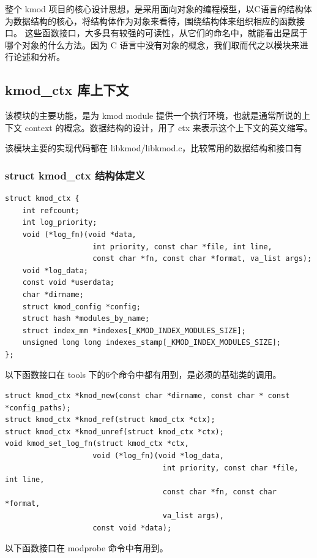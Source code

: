整个 kmod
项目的核心设计思想，是采用面向对象的编程模型，以C语言的结构体为数据结构的核心，将结构体作为对象来看待，围绕结构体来组织相应的函数接口。
这些函数接口，大多具有较强的可读性，从它们的命名中，就能看出是属于哪个对象的什么方法。因为
C 语言中没有对象的概念，我们取而代之以模块来进行论述和分析。

\subsection{kmod\_ctx 库上下文}

该模块的主要功能，是为 kmod module
提供一个执行环境，也就是通常所说的上下文 context
的概念。数据结构的设计，用了 ctx 来表示这个上下文的英文缩写。

该模块主要的实现代码都在 libkmod/libkmod.c，比较常用的数据结构和接口有

\subsubsection{struct kmod\_ctx 结构体定义}

{\begin{shaded}\begin{verbatim}
struct kmod_ctx {
    int refcount;
    int log_priority;
    void (*log_fn)(void *data,
                    int priority, const char *file, int line,
                    const char *fn, const char *format, va_list args);
    void *log_data;
    const void *userdata;
    char *dirname;
    struct kmod_config *config;
    struct hash *modules_by_name;
    struct index_mm *indexes[_KMOD_INDEX_MODULES_SIZE];
    unsigned long long indexes_stamp[_KMOD_INDEX_MODULES_SIZE];
};
\end{verbatim}\end{shaded}}
以下函数接口在 tools 下的6个命令中都有用到，是必须的基础类的调用。

{\begin{shaded}\begin{verbatim}
struct kmod_ctx *kmod_new(const char *dirname, const char * const *config_paths);
struct kmod_ctx *kmod_ref(struct kmod_ctx *ctx);
struct kmod_ctx *kmod_unref(struct kmod_ctx *ctx);
void kmod_set_log_fn(struct kmod_ctx *ctx,
                    void (*log_fn)(void *log_data,
                                    int priority, const char *file, int line,
                                    const char *fn, const char *format,
                                    va_list args),
                    const void *data);
\end{verbatim}\end{shaded}}
以下函数接口在 modprobe 命令中有用到。

